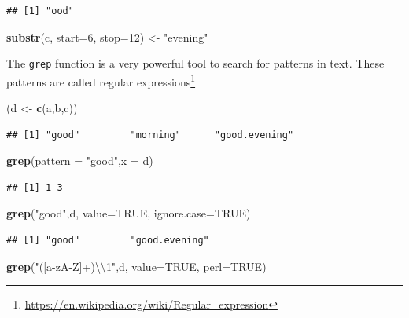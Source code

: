 \documentclass[]{book}
\newenvironment{Shaded}{\begin{snugshade}}{\end{snugshade}}
\newcommand{\CharTok}[1]{\textcolor[rgb]{0.31,0.60,0.02}{#1}}
\newcommand{\DataTypeTok}[1]{\textcolor[rgb]{0.13,0.29,0.53}{#1}}
\newcommand{\DecValTok}[1]{\textcolor[rgb]{0.00,0.00,0.81}{#1}}
\newcommand{\KeywordTok}[1]{\textcolor[rgb]{0.13,0.29,0.53}{\textbf{#1}}}
\newcommand{\NormalTok}[1]{#1}
\newcommand{\OtherTok}[1]{\textcolor[rgb]{0.56,0.35,0.01}{#1}}
\newcommand{\StringTok}[1]{\textcolor[rgb]{0.31,0.60,0.02}{#1}}
\renewcommand{\href}[2]{#2\footnote{\url{#1}}}
\theoremstyle{definition}
\theoremstyle{definition}
\theoremstyle{definition}
\theoremstyle{remark}
\begin{document}
\begin{verbatim}
## [1] "ood"
\end{verbatim}

\begin{Shaded}
\begin{Highlighting}[]
\KeywordTok{substr}\NormalTok{(c, }\DataTypeTok{start=}\DecValTok{6}\NormalTok{, }\DataTypeTok{stop=}\DecValTok{12}\NormalTok{) <-}\StringTok{ "evening"}
\end{Highlighting}
\end{Shaded}

The \texttt{grep} function is a very powerful tool to search for patterns in text.
These patterns are called \href{https://en.wikipedia.org/wiki/Regular_expression}{regular expressions}

\begin{Shaded}
\begin{Highlighting}[]
\NormalTok{(d <-}\StringTok{ }\KeywordTok{c}\NormalTok{(a,b,c))}
\end{Highlighting}
\end{Shaded}

\begin{verbatim}
## [1] "good"         "morning"      "good.evening"
\end{verbatim}

\begin{Shaded}
\begin{Highlighting}[]
\KeywordTok{grep}\NormalTok{(}\DataTypeTok{pattern =} \StringTok{"good"}\NormalTok{,}\DataTypeTok{x =}\NormalTok{ d) }
\end{Highlighting}
\end{Shaded}

\begin{verbatim}
## [1] 1 3
\end{verbatim}

\begin{Shaded}
\begin{Highlighting}[]
\KeywordTok{grep}\NormalTok{(}\StringTok{"good"}\NormalTok{,d, }\DataTypeTok{value=}\OtherTok{TRUE}\NormalTok{, }\DataTypeTok{ignore.case=}\OtherTok{TRUE}\NormalTok{) }
\end{Highlighting}
\end{Shaded}

\begin{verbatim}
## [1] "good"         "good.evening"
\end{verbatim}

\begin{Shaded}
\begin{Highlighting}[]
\KeywordTok{grep}\NormalTok{(}\StringTok{"([a-zA-Z]+)}\CharTok{\textbackslash{}\textbackslash{}}\StringTok{1"}\NormalTok{,d, }\DataTypeTok{value=}\OtherTok{TRUE}\NormalTok{, }\DataTypeTok{perl=}\OtherTok{TRUE}\NormalTok{) }
\end{Highlighting}
\end{Shaded}
\end{document}
